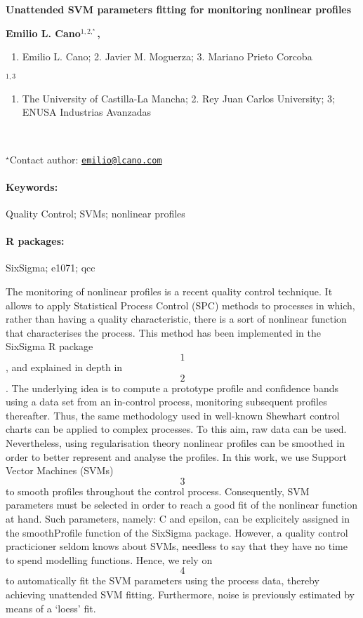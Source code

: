 \documentclass[11pt, a4paper]{article}
\renewcommand{\title}[1]{\begin{center}{\bf \LARGE #1}\end{center}}
\newcommand{\keywords}{\paragraph{Keywords:}}
\newcommand{\packages}{\paragraph{R packages:}}
\providecommand{\tightlist}{%
  \setlength{\itemsep}{0pt}\setlength{\parskip}{0pt}}
\begin{document}
\pagestyle{empty}

\title{Unattended SVM parameters fitting for monitoring nonlinear profiles}

\begin{center}
  {\bf Emilio L. Cano$^{1, 2,^\star}$, \begin{enumerate}
\def\labelenumi{\arabic{enumi}.}
\tightlist
\item
  Emilio L. Cano; 2. Javier M. Moguerza; 3. Mariano Prieto Corcoba
\end{enumerate}$^{1, 3}$}
\end{center}

\vskip 0.3cm

\begin{affiliations}
\begin{enumerate}
\begin{minipage}{0.915\textwidth}
\centering
\item \begin{enumerate}
\def\labelenumi{\arabic{enumi}.}
\tightlist
\item
  The University of Castilla-La Mancha; 2. Rey Juan Carlos University;
  3; ENUSA Industrias Avanzadas
\end{enumerate} \\[-2pt]
\end{minipage}
\end{enumerate}
$^\star$Contact author: \href{mailto:emilio@lcano.com}{\nolinkurl{emilio@lcano.com}}\\
\end{affiliations}

\keywords Quality Control; SVMs; nonlinear profiles
\packages SixSigma; e1071; qcc

\vskip 0.8cm

The monitoring of nonlinear profiles is a recent quality control
technique. It allows to apply Statistical Process Control (SPC) methods
to processes in which, rather than having a quality characteristic,
there is a sort of nonlinear function that characterises the process.
This method has been implemented in the SixSigma R package \[1\], and
explained in depth in \[2\]. The underlying idea is to compute a
prototype profile and confidence bands using a data set from an
in-control process, monitoring subsequent profiles thereafter. Thus, the
same methodology used in well-known Shewhart control charts can be
applied to complex processes. To this aim, raw data can be used.
Nevertheless, using regularisation theory nonlinear profiles can be
smoothed in order to better represent and analyse the profiles. In this
work, we use Support Vector Machines (SVMs) \[3\] to smooth profiles
throughout the control process. Consequently, SVM parameters must be
selected in order to reach a good fit of the nonlinear function at hand.
Such parameters, namely: C and epsilon, can be explicitely assigned in
the smoothProfile function of the SixSigma package. However, a quality
control practicioner seldom knows about SVMs, needless to say that they
have no time to spend modelling functions. Hence, we rely on \[4\] to
automatically fit the SVM parameters using the process data, thereby
achieving unattended SVM fitting. Furthermore, noise is previously
estimated by means of a `loess' fit.
\end{document}
